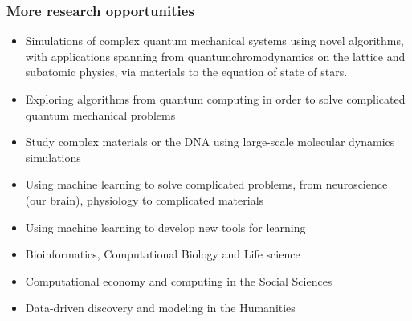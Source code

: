 \documentclass{beamer}
\begin{document}
\begin{frame}
\frametitle{More research opportunities}

\begin{itemize}
\item Simulations of complex quantum mechanical systems using novel algorithms, with applications spanning from quantumchromodynamics on the lattice and subatomic physics, via materials to the equation of state of stars.

\item Exploring algorithms from quantum computing in order to solve complicated quantum mechanical problems

\item Study complex materials or the DNA using large-scale molecular dynamics simulations

\item Using machine learning to solve complicated problems, from  neuroscience (our brain), physiology to complicated materials 

\item Using machine learning to develop new tools for learning

\item Bioinformatics, Computational Biology  and Life science

\item Computational economy and computing in the Social Sciences 

\item Data-driven discovery and modeling in  the Humanities
\end{itemize}

\noindent
\end{frame}
\end{document}
